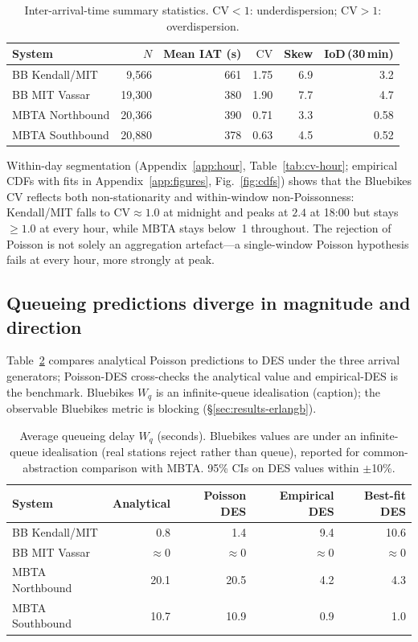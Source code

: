 \begin{table}[h]
\centering
\caption{Inter-arrival-time summary statistics. $\mathrm{CV} < 1$: underdispersion; $\mathrm{CV} > 1$: overdispersion.}
\label{tab:summary}
\footnotesize
\begin{tabular}{@{}lrrrrr@{}}
\toprule
System & $N$ & Mean IAT (s) & $\mathrm{CV}$ & Skew & IoD\,(30\,min) \\
\midrule
BB Kendall/MIT   & 9{,}566  & 661 & 1.75 & 6.9 & 3.2 \\
BB MIT Vassar    & 19{,}300 & 380 & 1.90 & 7.7 & 4.7 \\
MBTA Northbound  & 20{,}366 & 390 & 0.71 & 3.3 & 0.58 \\
MBTA Southbound  & 20{,}880 & 378 & 0.63 & 4.5 & 0.52 \\
\bottomrule
\end{tabular}
\end{table}

Within-day segmentation (Appendix~\ref{app:hour}, Table~\ref{tab:cv-hour}; empirical CDFs with fits in Appendix~\ref{app:figures}, Fig.~\ref{fig:cdfs}) shows that the Bluebikes CV reflects both non-stationarity and within-window non-Poissonness: Kendall/MIT falls to $\mathrm{CV} \approx 1.0$ at midnight and peaks at $2.4$ at 18:00 but stays $\geq 1.0$ at every hour, while MBTA stays below~1 throughout. The rejection of Poisson is not solely an aggregation artefact---a single-window Poisson hypothesis fails at every hour, more strongly at peak.

\subsection{Queueing predictions diverge in magnitude and direction}\label{sec:results-queueing}

Table~\ref{tab:queueing} compares analytical Poisson predictions to DES under the three arrival generators; Poisson-DES cross-checks the analytical value and empirical-DES is the benchmark. Bluebikes $W_q$ is an infinite-queue idealisation (caption); the observable Bluebikes metric is blocking (\S\ref{sec:results-erlangb}).

\begin{table}[h]
\centering
\caption{Average queueing delay $W_q$ (seconds). Bluebikes values are under an infinite-queue idealisation (real stations reject rather than queue), reported for common-abstraction comparison with MBTA. 95\% CIs on DES values within $\pm$10\%.}
\label{tab:queueing}
\footnotesize
\begin{tabular}{@{}lrrrr@{}}
\toprule
System & Analytical & Poisson DES & Empirical DES & Best-fit DES \\
\midrule
BB Kendall/MIT   & 0.8  & 1.4  & 9.4  & 10.6 \\
BB MIT Vassar    & $\approx 0$ & $\approx 0$ & $\approx 0$ & $\approx 0$ \\
MBTA Northbound  & 20.1 & 20.5 & 4.2  & 4.3 \\
MBTA Southbound  & 10.7 & 10.9 & 0.9  & 1.0 \\
\bottomrule
\end{tabular}
\end{table}

